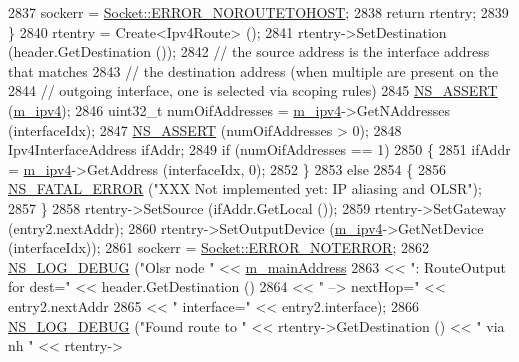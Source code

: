 \begin{DoxyCode}
2837           sockerr = \hyperlink{classns3_1_1Socket_ada1328c5ae0c28cb2a982caf8f6d6ccaa0f8ecb5a4ddbce3bade35fa12c3d49e8}{Socket::ERROR\_NOROUTETOHOST};
2838           \textcolor{keywordflow}{return} rtentry;
2839         \}
2840       rtentry = Create<Ipv4Route> ();
2841       rtentry->SetDestination (header.GetDestination ());
2842       \textcolor{comment}{// the source address is the interface address that matches}
2843       \textcolor{comment}{// the destination address (when multiple are present on the}
2844       \textcolor{comment}{// outgoing interface, one is selected via scoping rules)}
2845       \hyperlink{assert_8h_a6dccdb0de9b252f60088ce281c49d052}{NS\_ASSERT} (\hyperlink{classns3_1_1olsr_1_1RoutingProtocol_afede79b25ec57e797ff900ae01bca1df}{m\_ipv4});
2846       uint32\_t numOifAddresses = \hyperlink{classns3_1_1olsr_1_1RoutingProtocol_afede79b25ec57e797ff900ae01bca1df}{m\_ipv4}->GetNAddresses (interfaceIdx);
2847       \hyperlink{assert_8h_a6dccdb0de9b252f60088ce281c49d052}{NS\_ASSERT} (numOifAddresses > 0);
2848       Ipv4InterfaceAddress ifAddr;
2849       \textcolor{keywordflow}{if} (numOifAddresses == 1)
2850         \{
2851           ifAddr = \hyperlink{classns3_1_1olsr_1_1RoutingProtocol_afede79b25ec57e797ff900ae01bca1df}{m\_ipv4}->GetAddress (interfaceIdx, 0);
2852         \}
2853       \textcolor{keywordflow}{else}
2854         \{
2856           \hyperlink{group__fatal_ga5131d5e3f75d7d4cbfd706ac456fdc85}{NS\_FATAL\_ERROR} (\textcolor{stringliteral}{"XXX Not implemented yet:  IP aliasing and OLSR"});
2857         \}
2858       rtentry->SetSource (ifAddr.GetLocal ());
2859       rtentry->SetGateway (entry2.nextAddr);
2860       rtentry->SetOutputDevice (\hyperlink{classns3_1_1olsr_1_1RoutingProtocol_afede79b25ec57e797ff900ae01bca1df}{m\_ipv4}->GetNetDevice (interfaceIdx));
2861       sockerr = \hyperlink{classns3_1_1Socket_ada1328c5ae0c28cb2a982caf8f6d6ccaaa7eb006d73c5ad0117c5591fcb3469f7}{Socket::ERROR\_NOTERROR};
2862       \hyperlink{group__logging_ga413f1886406d49f59a6a0a89b77b4d0a}{NS\_LOG\_DEBUG} (\textcolor{stringliteral}{"Olsr node "} << \hyperlink{classns3_1_1olsr_1_1RoutingProtocol_a58cc50ed5d1039aab603e90e318aabfb}{m\_mainAddress}
2863                                  << \textcolor{stringliteral}{": RouteOutput for dest="} << header.GetDestination ()
2864                                  << \textcolor{stringliteral}{" --> nextHop="} << entry2.nextAddr
2865                                  << \textcolor{stringliteral}{" interface="} << entry2.interface);
2866       \hyperlink{group__logging_ga413f1886406d49f59a6a0a89b77b4d0a}{NS\_LOG\_DEBUG} (\textcolor{stringliteral}{"Found route to "} << rtentry->GetDestination () << \textcolor{stringliteral}{" via nh "} << rtentry->

\end{DoxyCode}
